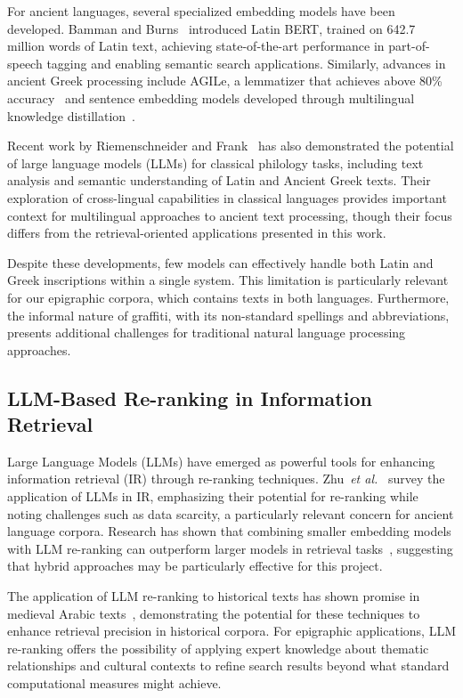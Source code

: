 \documentclass[final,greek,american]{anthology-ch}
\newcommand{\etal}{\textit{et al.}\xspace}
\begin{document}
For ancient languages, several specialized embedding models have been developed. Bamman and Burns~\cite{bamman_latin_2020} introduced Latin BERT, trained on 642.7 million words of Latin text, achieving state-of-the-art performance in part-of-speech tagging and enabling semantic search applications. Similarly, advances in ancient Greek processing include AGILe, a lemmatizer that achieves above 80\% accuracy~\cite{de_graaf_agile_nodate} and sentence embedding models developed through multilingual knowledge distillation~\cite{krahn_sentence_2023}.

Recent work by Riemenschneider and Frank~\cite{riemenschneider_exploring_2023} has also demonstrated the potential of large language models (LLMs) for classical philology tasks, including text analysis and semantic understanding of Latin and Ancient Greek texts. Their exploration of cross-lingual capabilities in classical languages provides important context for multilingual approaches to ancient text processing, though their focus differs from the retrieval-oriented applications presented in this work.

Despite these developments, few models can effectively handle both Latin and Greek inscriptions within a single system. This limitation is particularly relevant for our epigraphic corpora, which
contains texts in both languages. Furthermore, the informal nature of graffiti, with its non-standard spellings and abbreviations, presents additional challenges for traditional natural language processing approaches.

\subsection{LLM-Based Re-ranking in Information Retrieval}

Large Language Models (LLMs) have emerged as powerful tools for enhancing information retrieval (IR) through re-ranking techniques. Zhu~\etal~\cite{zhu_large_2024} survey the application of LLMs in IR, emphasizing their potential for re-ranking while noting challenges such as data scarcity, a particularly relevant concern for ancient language corpora. Research has shown that combining smaller embedding models with LLM re-ranking can outperform larger models in retrieval tasks~\cite{rao_rethinking_2025}, suggesting that hybrid approaches may be particularly effective for this project.

The application of LLM re-ranking to historical texts has shown promise in medieval Arabic texts~\cite{muther_querying_2023}, demonstrating the potential for these techniques to enhance retrieval precision in historical corpora. For epigraphic applications, LLM re-ranking offers the possibility of applying expert knowledge about thematic relationships and cultural contexts to refine search results beyond what standard computational measures might achieve.
\end{document}
